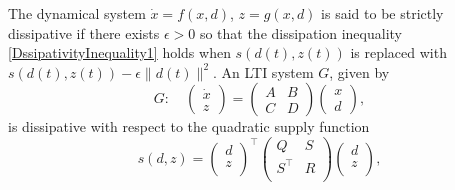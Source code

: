 \documentclass[11pt,a4paper,oneside,DIV=12,headings=small]{scrartcl}
\theoremstyle{plain}
\begin{document}
The dynamical system  $\dot{x}=f(x,d)$, $z=g(x,d)$ is said to be strictly dissipative if there exists $\epsilon > 0$ so that the dissipation inequality \eqref{DssipativityInequality1} holds when $s(d(t),z(t))$ is replaced with  $s(d(t),z(t))-\epsilon \|d(t)\|^2$. 
An LTI system $G$, given by
\begin{equation}
\label{LTI_G}
G: \quad \begin{pmatrix}\dot{x} \\ z \end{pmatrix} 
=
\begin{pmatrix} A & B \\ C & D \end{pmatrix}
\begin{pmatrix} x \\ d \end{pmatrix},
\end{equation}
is dissipative with respect to the quadratic supply function
\begin{equation}
\label{QuadraticSupply}
s(d,z)=\left(\begin{matrix}
  d\\
  z\\
\end{matrix}\right)^{\top}
\left(\begin{matrix}
  Q & S\\
  S^{\top} & R\\
\end{matrix}\right)
\left(\begin{matrix}
  d\\
  z\\
\end{matrix}\right), 
\end{equation}
\end{document}
